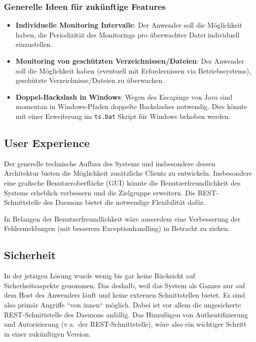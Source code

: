 \documentclass[a4paper,12pt]{report}
\begin{document}
    \subsubsection{Generelle Ideen für zukünftige Features}
    \begin{itemize}
        \item \textbf{Individuelle Monitoring Intervalle}: Der Anwender soll die Möglichkeit haben, die Periodizität des Monitorings pro überwachter Datei individuell einzustellen.
        \item \textbf{Monitoring von geschützten Verzeichnissen/Dateien}: Der Anwender soll die Möglichkeit haben (eventuell mit Erfordernissen via Betriebssystems), geschützte Verzeichnisse/Dateien zu überwachen.
        \item \textbf{Doppel-Backslash in Windows}: Wegen des Escapings von Java sind momentan in Windows-Pfaden doppelte Backslashes notwendig.
        Dies könnte mit einer Erweiterung im \texttt{ts.bat} Skript für Windows behoben werden.
    \end{itemize}


    \subsection{User Experience}\label{subsec:user-experience}
    Der generelle technische Aufbau des Systems und insbesondere dessen Architektur bieten die Möglichkeit zusätzliche Clients zu entwickeln.
    Insbesondere eine grafische Benutzeroberfläche (GUI) könnte die Benutzerfreundlichkeit des Systems erheblich verbessern und die Zielgruppe erweitern.
    Die REST-Schnittstelle des Daemons bietet die notwendige Flexibilität dafür.

    In Belangen der Benutzerfreundlichkeit wäre ausserdem eine Verbesserung der Fehlermeldungen (mit besserem Exceptionhandling) in Betracht zu ziehen.

    \clearpage

    \subsection{Sicherheit}\label{subsec:sicherheit}
    In der jetzigen Lösung wurde wenig bis gar keine Rücksicht auf Sicherheitsaspekte genommen.
    Das deshalb, weil das System als Ganzes nur auf dem Host des Anwenders läuft und keine externen Schnittstellen bietet.
    Es sind also primär Angriffe ``von innen`` möglich.
    Dabei ist vor allem die ungesicherte REST-Schnittstelle des Daemons anfällig.
    Das Hinzufügen von Authentifizierung und Autorisierung (v.a.\ der REST-Schnittstelle), wäre also ein wichtiger Schritt in einer zukünftigen Version.
\end{document}
